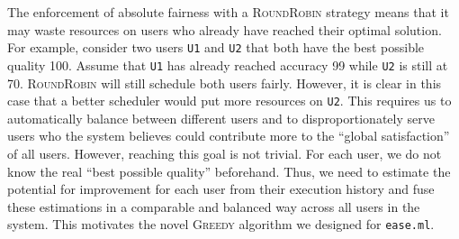 \documentclass[letterpaper]{vldb}
\newcommand{\eml}{\texttt{ease.ml}\xspace}
\newcommand{\rr}{\textsc{RoundRobin}\xspace}
\newcommand{\greedy}{\textsc{Greedy}\xspace}
\begin{document}
The enforcement of absolute fairness
with a \rr strategy means that it may
waste resources on users who already have
reached their optimal solution. For example,
consider two users \texttt{U1}
and \texttt{U2} that both have the best
possible quality 100. Assume that \texttt{U1}
has already reached accuracy 99 while 
\texttt{U2} is still at 70. \rr
will still schedule both users
fairly. However, it is clear in this case
that a better scheduler would put more
resources on \texttt{U2}. This requires
us to automatically balance between
different users and to disproportionately 
serve users who the system believes
could contribute more to the ``global satisfaction''
of all users. However, reaching this
goal is not trivial. For each user,
we do not know the real ``best possible
quality'' beforehand. Thus, we need
to estimate the potential for 
improvement for each user from their
execution history and fuse these
estimations in a comparable and balanced
way across all users in the system.
This motivates
the novel \greedy algorithm we designed for \eml.
\end{document}
